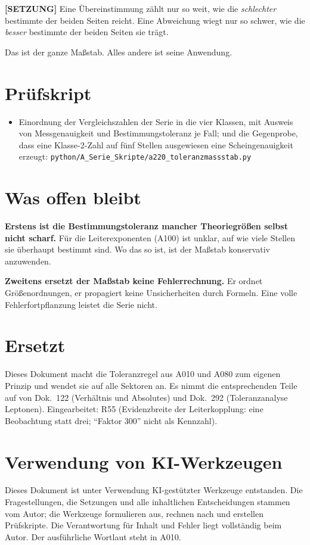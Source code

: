 \textbf{[SETZUNG]} Eine Übereinstimmung zählt nur so weit, wie die
\emph{schlechter} bestimmte der beiden Seiten reicht. Eine Abweichung wiegt nur
so schwer, wie die \emph{besser} bestimmte der beiden Seiten sie trägt.

Das ist der ganze Maßstab. Alles andere ist seine Anwendung.

\section{Prüfskript}

\begin{itemize}
  \item Einordnung der Vergleichszahlen der Serie in die vier Klassen, mit
    Ausweis von Messgenauigkeit und Bestimmungstoleranz je Fall; und die
    Gegenprobe, dass eine Klasse-2-Zahl auf fünf Stellen ausgewiesen eine
    Scheingenauigkeit erzeugt:
    \texttt{python/A\_Serie\_Skripte/a220\_toleranzmassstab.py}
\end{itemize}

\section{Was offen bleibt}

\textbf{Erstens ist die Bestimmungstoleranz mancher Theoriegrößen selbst nicht
scharf.} Für die Leiterexponenten (A100) ist unklar, auf wie viele Stellen sie
überhaupt bestimmt sind. Wo das so ist, ist der Maßstab konservativ anzuwenden.

\textbf{Zweitens ersetzt der Maßstab keine Fehlerrechnung.} Er ordnet
Größenordnungen, er propagiert keine Unsicherheiten durch Formeln. Eine volle
Fehlerfortpflanzung leistet die Serie nicht.

\section{Ersetzt}

Dieses Dokument macht die Toleranzregel aus A010 und A080 zum eigenen Prinzip
und wendet sie auf alle Sektoren an. Es nimmt die entsprechenden Teile auf von
Dok.~122 (Verhältnis und Absolutes) und Dok.~292 (Toleranzanalyse Leptonen).
Eingearbeitet: R55 (Evidenzbreite der Leiterkopplung: eine Beobachtung statt
drei; \enquote{Faktor 300} nicht als Kennzahl).

\section{Verwendung von KI-Werkzeugen}

Dieses Dokument ist unter Verwendung KI-gestützter Werkzeuge entstanden. Die
Fragestellungen, die Setzungen und alle inhaltlichen Entscheidungen stammen vom
Autor; die Werkzeuge formulieren aus, rechnen nach und erstellen Prüfskripte.
Die Verantwortung für Inhalt und Fehler liegt vollständig beim Autor. Der
ausführliche Wortlaut steht in A010.
